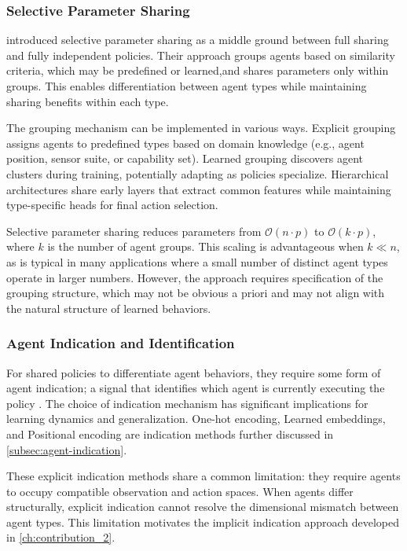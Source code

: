 \subsubsection{Selective Parameter Sharing}

\cite{christianos2021} introduced selective parameter sharing as a 
middle ground between full sharing and fully independent policies. 
Their approach groups agents based on similarity criteria, which may 
be predefined or learned,and shares parameters only within groups. 
This enables differentiation between agent types while maintaining 
sharing benefits within each type.

The grouping mechanism can be implemented in various ways. 
Explicit grouping assigns agents to predefined types based on domain 
knowledge (e.g., agent position, sensor suite, or capability set). 
Learned grouping discovers agent clusters during training, 
potentially adapting as policies specialize. 
Hierarchical architectures share early layers that extract common 
features while maintaining type-specific heads for final action selection.

Selective parameter sharing reduces parameters from \(\mathcal{O}(n \cdot p)\) 
to \(\mathcal{O}(k \cdot p)\), where \(k\) is the number of agent groups. 
This scaling is advantageous when \(k \ll n\), as is typical in many applications 
where a small number of distinct agent types operate in larger numbers. 
However, the approach requires specification of the grouping structure, 
which may not be obvious a priori and may not align with the natural 
structure of learned behaviors.

\subsubsection{Agent Indication and Identification}

For shared policies to differentiate agent behaviors, 
they require some form of agent indication; a signal that 
identifies which agent is currently executing the policy \cite{terry2020}. 
The choice of indication mechanism has significant implications for 
learning dynamics and generalization.
One-hot encoding, Learned embeddings, and Positional encoding
are indication methods further discussed in \cref{subsec:agent-indication}.

These explicit indication methods share a common limitation: 
they require agents to occupy compatible observation and action spaces. 
When agents differ structurally, explicit indication cannot resolve the 
dimensional mismatch between agent types. This limitation motivates the 
implicit indication approach developed in \cref{ch:contribution_2}.

